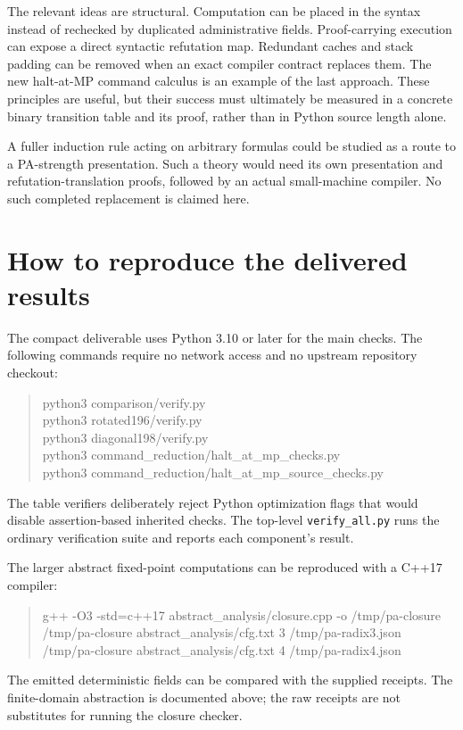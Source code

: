 \documentclass[11pt,letterpaper]{article}
\newcommand{\code}[1]{\texttt{\nolinkurl{#1}}}
\begin{document}
The relevant ideas are structural. Computation can be placed in the
syntax instead of rechecked by duplicated administrative fields.
Proof-carrying execution can expose a direct syntactic refutation map.
Redundant caches and stack padding can be removed when an exact compiler
contract replaces them. The new halt-at-MP command calculus is an
example of the last approach. These principles are useful, but their
success must ultimately be measured in a concrete binary transition
table and its proof, rather than in Python source length alone.

A fuller induction rule acting on arbitrary formulas could be studied
as a route to a PA-strength presentation. Such a theory would need its
own presentation and refutation-translation proofs, followed by an
actual small-machine compiler. No such completed replacement is claimed
here.

\section{How to reproduce the delivered results}

The compact deliverable uses Python 3.10 or later for the main checks.
The following commands require no network access and no upstream
repository checkout:
\begin{quote}\small\ttfamily
python3 comparison/verify.py\\
python3 rotated196/verify.py\\
python3 diagonal198/verify.py\\
python3 command\_reduction/halt\_at\_mp\_checks.py\\
python3 command\_reduction/halt\_at\_mp\_source\_checks.py
\end{quote}
The table verifiers deliberately reject Python optimization flags that
would disable assertion-based inherited checks. The top-level
\code{verify_all.py} runs the ordinary verification suite and reports
each component's result.

The larger abstract fixed-point computations can be reproduced with a
C++17 compiler:
\begin{quote}\small\ttfamily
g++ -O3 -std=c++17 abstract\_analysis/closure.cpp -o /tmp/pa-closure\\
/tmp/pa-closure abstract\_analysis/cfg.txt 3 /tmp/pa-radix3.json\\
/tmp/pa-closure abstract\_analysis/cfg.txt 4 /tmp/pa-radix4.json
\end{quote}
The emitted deterministic fields can be compared with the supplied
receipts. The finite-domain abstraction is documented above;
the raw receipts are not substitutes for running the closure checker.
\end{document}
